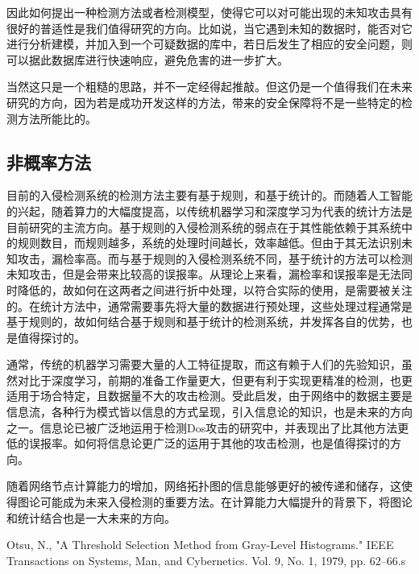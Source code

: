 \documentclass[11pt]{article} %
\begin{document}
因此如何提出一种检测方法或者检测模型，使得它可以对可能出现的未知攻击具有很好的普适性是我们值得研究的方向。比如说，当它遇到未知的数据时，能否对它进行分析建模，并加入到一个可疑数据的库中，若日后发生了相应的安全问题，则可以据此数据库进行快速响应，避免危害的进一步扩大。

当然这只是一个粗糙的思路，并不一定经得起推敲。但这仍是一个值得我们在未来研究的方向，因为若是成功开发这样的方法，带来的安全保障将不是一些特定的检测方法所能比的。

\subsection{非概率方法}
\label{nonprob}

目前的入侵检测系统的检测方法主要有基于规则，和基于统计的。而随着人工智能的兴起，随着算力的大幅度提高，以传统机器学习和深度学习为代表的统计方法是目前研究的主流方向。基于规则的入侵检测系统的弱点在于其性能依赖于其系统中的规则数目，而规则越多，系统的处理时间越长，效率越低。但由于其无法识别未知攻击，漏检率高。而与基于规则的入侵检测系统不同，基于统计的方法可以检测未知攻击，但是会带来比较高的误报率。从理论上来看，漏检率和误报率是无法同时降低的，故如何在这两者之间进行折中处理，以符合实际的使用，是需要被关注的。在统计方法中，通常需要事先将大量的数据进行预处理，这些处理过程通常是基于规则的，故如何结合基于规则和基于统计的检测系统，并发挥各自的优势，也是值得探讨的。

通常，传统的机器学习需要大量的人工特征提取，而这有赖于人们的先验知识，虽然对比于深度学习，前期的准备工作量更大，但更有利于实现更精准的检测，也更适用于场合特定，且数据量不大的攻击检测。受此启发，由于网络中的数据主要是信息流，各种行为模式皆以信息的方式呈现，引入信息论的知识，也是未来的方向之一。信息论已被广泛地运用于检测Dos攻击的研究中，并表现出了比其他方法更低的误报率。如何将信息论更广泛的运用于其他的攻击检测，也是值得探讨的方向。

随着网络节点计算能力的增加，网络拓扑图的信息能够更好的被传递和储存，这使得图论可能成为未来入侵检测的重要方法。在计算能力大幅提升的背景下，将图论和统计结合也是一大未来的方向。

\begin{thebibliography}{99}

 Otsu, N., "A Threshold Selection Method from Gray-Level Histograms." IEEE Transactions on Systems, Man, and Cybernetics. Vol. 9, No. 1, 1979, pp. 62–66.s

\end{thebibliography}
\end{document}
